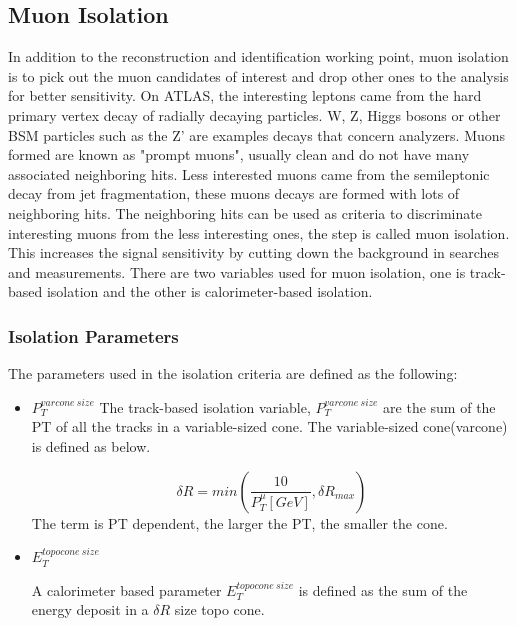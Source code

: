 \subsection{Muon Isolation}
In addition to the reconstruction and identification working point, muon isolation is to pick out the muon candidates of interest and drop other ones to the analysis for better sensitivity. On ATLAS, the interesting leptons came from the hard primary vertex decay of radially decaying particles. W, Z, Higgs bosons or other BSM particles such as the Z' are examples decays that concern analyzers. Muons formed are known as "prompt muons", usually clean and do not have many associated neighboring hits. Less interested muons came from the semileptonic decay from jet fragmentation, these muons decays are formed with lots of
neighboring hits. The neighboring hits can be used as criteria to discriminate interesting muons from the less interesting ones, the step is called muon isolation. This increases the signal sensitivity by cutting down the background in searches and measurements.
There are two variables used for muon isolation, one is track-based isolation and the other is calorimeter-based isolation. 

\subsubsection*{Isolation Parameters}
The parameters used in the isolation criteria are defined as the following:
\begin{itemize}
    \item  $P_{T}^{varcone\:size}$ \newline
        The track-based isolation variable, $P_{T}^{varcone\:size}$ are the sum of the PT of all the tracks in a variable-sized cone. The variable-sized cone(varcone) is defined as below.

    
\[ \delta R = min(\frac{10}{P^{\mu}_{T}[GeV]}, \delta R_{max}) \]
The term is PT dependent, the larger the PT, the smaller the cone. 
    \item $E^{topocone\:size}_{T}$ \newline

        A calorimeter based parameter $E^{topocone\:size}_T$ is defined as the sum of the energy deposit in a $\delta R$ size topo cone. 

\end{itemize}

